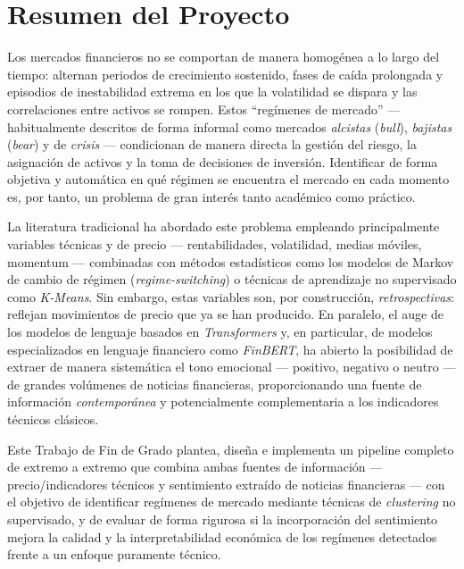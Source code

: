 \chapter*{Resumen del Proyecto}

Los mercados financieros no se comportan de manera homogénea a lo largo
del tiempo: alternan periodos de crecimiento sostenido, fases de caída
prolongada y episodios de inestabilidad extrema en los que la volatilidad
se dispara y las correlaciones entre activos se rompen. Estos
``regímenes de mercado'' --- habitualmente descritos de forma informal
como mercados \emph{alcistas} (\textit{bull}), \emph{bajistas}
(\textit{bear}) y de \emph{crisis} --- condicionan de manera directa la
gestión del riesgo, la asignación de activos y la toma de decisiones de
inversión. Identificar de forma objetiva y automática en qué régimen se
encuentra el mercado en cada momento es, por tanto, un problema de gran
interés tanto académico como práctico.

La literatura tradicional ha abordado este problema empleando
principalmente variables técnicas y de precio --- rentabilidades,
volatilidad, medias móviles, momentum --- combinadas con métodos
estadísticos como los modelos de Markov de cambio de régimen
(\textit{regime-switching}) o técnicas de aprendizaje no supervisado como
\textit{K-Means}. Sin embargo, estas variables son, por construcción,
\emph{retrospectivas}: reflejan movimientos de precio que ya se han
producido. En paralelo, el auge de los modelos de lenguaje basados en
\textit{Transformers} y, en particular, de modelos especializados en
lenguaje financiero como \textit{FinBERT}, ha abierto la posibilidad de
extraer de manera sistemática el tono emocional --- positivo, negativo o
neutro --- de grandes volúmenes de noticias financieras, proporcionando
una fuente de información \emph{contemporánea} y potencialmente
complementaria a los indicadores técnicos clásicos.

Este Trabajo de Fin de Grado plantea, diseña e implementa un pipeline
completo de extremo a extremo que combina ambas fuentes de información
--- precio/indicadores técnicos y sentimiento extraído de noticias
financieras --- con el objetivo de identificar regímenes de mercado
mediante técnicas de \textit{clustering} no supervisado, y de evaluar de
forma rigurosa si la incorporación del sentimiento mejora la calidad y la
interpretabilidad económica de los regímenes detectados frente a un
enfoque puramente técnico.

